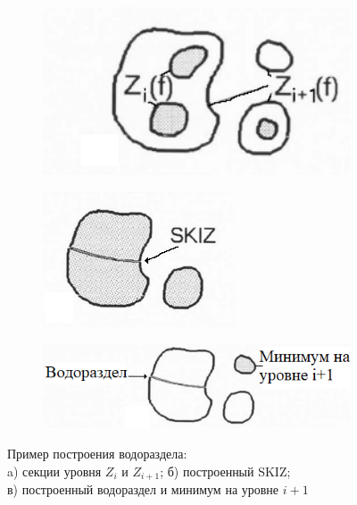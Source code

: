 \documentclass[14pt, a4paper]{extreport}
\begin{document}
	\begin{figure}[h!]
		\begin{subfigure}{.28\textwidth}
			\centering
			\includegraphics[width = 1\textwidth]{image/chapter_2/SKIZ_Watershed_build1}
			\caption{}
		\end{subfigure}
		\begin{subfigure}{.20\textwidth}
			\centering
			\includegraphics[width = \textwidth]{image/chapter_2/SKIZ_Watershed_build2}
			\caption{}
		\end{subfigure}
		\begin{subfigure}{.46\textwidth}
			\centering
			\includegraphics[width = \textwidth]{image/chapter_2/SKIZ_Watershed_build3}
			\caption{}
		\end{subfigure}
		\centering
		\caption{Пример построения водораздела:\\ a) секции уровня $Z_i$ и $Z_{i+1}$; б) построенный SKIZ;\\ в) построенный водораздел и минимум на уровне $i+1$}
		\label{fig:SKIZ_Watershed_build}
	\end{figure}
	
\end{document}
